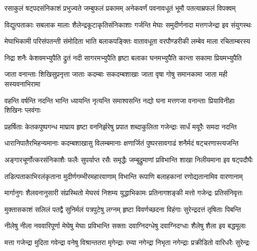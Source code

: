\fourlineindentedshloka
{रसाकुलं षट्पदसंनिकाशं}
{ प्रभुज्यते जम्बुफलं प्रकामम्}
{अनेकवर्णं पवनावधूतं}
{ भूमौ पतत्याम्रफलं विपक्वम्} %

\fourlineindentedshloka
{विद्युत्पताकाः सबलाक मालाः}
{ शैलेन्द्रकूटाकृतिसंनिकाशाः}
{गर्जन्ति मेघाः समुदीर्णनादा}
{ मत्तगजेन्द्रा इव संयुगस्थः} %

\fourlineindentedshloka
{मेघाभिकामी परिसंपतन्ती}
{ संमोदिता भाति बलाकपङ्क्तिः}
{वातावधूता वरपौण्डरीकी}
{ लम्बेव माला रचिताम्बरस्य} %

\fourlineindentedshloka
{निद्रा शनैः केशवमभ्युपैति}
{ द्रुतं नदी सागरमभ्युपैति}
{हृष्टा बलाका घनमभ्युपैति}
{ कान्ता सकामा प्रियमभ्युपैति} %

\fourlineindentedshloka
{जाता वनान्ताः शिखिसुप्रनृत्ता}
{ जाताः कदम्बाः सकदम्बशाखाः}
{जाता वृषा गोषु समानकामा}
{ जाता मही सस्यवनाभिरामा} %

\fourlineindentedshloka
{वहन्ति वर्षन्ति नदन्ति भान्ति}
{ ध्यायन्ति नृत्यन्ति समाश्वसन्ति}
{नद्यो घना मत्तगजा वनान्ताः}
{ प्रियाविनीहाः शिखिनः प्लवंगाः} %

\fourlineindentedshloka
{प्रहर्षिताः केतकपुष्पगन्ध}
{माघ्राय हृष्टा वननिर्झरेषु}
{प्रपात शब्दाकुलिता गजेन्द्राः}
{ सार्धं मयूरैः समदा नदन्ति} %

\fourlineindentedshloka
{धारानिपातैरभिहन्यमानाः}
{ कदम्बशाखासु विलम्बमानाः}
{क्षणार्जितं पुष्परसावगाढं}
{ शनैर्मदं षट्चरणास्त्यजन्ति} %

\fourlineindentedshloka
{अङ्गारचूर्णोत्करसंनिकाशैः}
{ फलैः सुपर्याप्त रसैः समृद्धैः}
{जम्बूद्रुमाणां प्रविभान्ति शाखा}
{ निलीयमाना इव षट्पदौघैः} %

\fourlineindentedshloka
{तडित्पताकाभिरलंकृताना}
{मुदीर्णगम्भीरमहारवाणाम्}
{विभान्ति रूपाणि बलाहकानां}
{ रणोद्यतानामिव वारणानाम्} %

\fourlineindentedshloka
{मार्गानुगः शैलवनानुसारी}
{ संप्रस्थितो मेघरवं निशम्य}
{युद्धाभिकामः प्रतिनागशङ्की}
{ मत्तो गजेन्द्रः प्रतिसंनिवृत्तः} %

\fourlineindentedshloka
{मुक्तासकाशं सलिलं पतद्वै}
{ सुनिर्मलं पत्रपुटेषु लग्नम्}
{हृष्टा विवर्णच्छदना विहंगाः}
{ सुरेन्द्रदत्तं तृषिताः पिबन्ति} %

\fourlineindentedshloka
{नीलेषु नीला नववारिपूर्णा}
{ मेघेषु मेघाः प्रविभान्ति सक्ताः}
{दवाग्निदग्धेषु दवाग्निदग्धाः}
{ शैलेषु शैला इव बद्धमूलाः} %

\fourlineindentedshloka
{मत्ता गजेन्द्रा मुदिता गवेन्द्रा}
{ वनेषु विश्रान्ततरा मृगेन्द्राः}
{रम्या नगेन्द्रा निभृता नगेन्द्राः}
{ प्रक्रीडितो वारिधरैः सुरेन्द्रः} %


